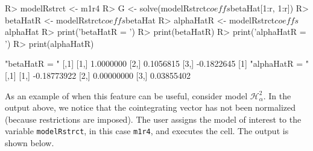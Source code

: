 \documentclass[article]{jss}
\begin{document}
\begin{CodeChunk} 
\begin{CodeInput}
R> modelRstrct <- m1r4
R> G <- solve(modelRstrct$coeffs$betaHat[1:r, 1:r])
R> betaHatR <- modelRstrct$coeffs$betaHat %
R> alphaHatR <- modelRstrct$coeffs$alphaHat %
R> print('betaHatR = ')
R> print(betaHatR)
R> print('alphaHatR = ')
R> print(alphaHatR)
\end{CodeInput}
\begin{CodeOutput}
[1] "betaHatR = "
           [,1]
[1,]  1.0000000
[2,]  0.1056815
[3,] -0.1822645
[1] "alphaHatR = "
            [,1]
[1,] -0.18773922
[2,]  0.00000000
[3,]  0.03855402
\end{CodeOutput}
\end{CodeChunk}  

As an example of when this feature can be useful, consider model $\mathscr{H}_{\alpha}^2$. In the output above, we notice that the cointegrating vector has not been normalized (because restrictions are imposed). The user assigns the model of interest to the variable \verb|modelRstrct|, in this case \verb|m1r4|, and executes the cell. The output is shown below.



\end{document}
